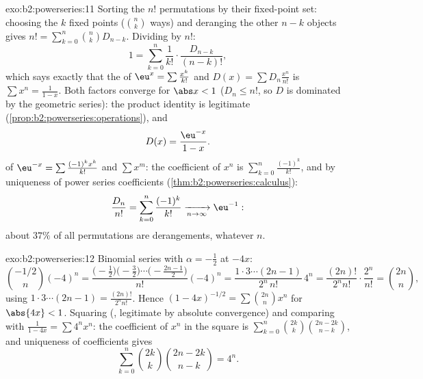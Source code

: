 \begin{solution}{exo:b2:powerseries:11}
Sorting the $n!$ permutations by their fixed-point set: choosing
the $k$ fixed points ($\binom nk$ ways) and deranging the other
$n - k$ objects gives $n! = \sum_{k=0}^n\binom nk D_{n-k}$.
Dividing by $n!$:
\[
1 = \sum_{k=0}^{n}\frac{1}{k!}\cdot\frac{D_{n-k}}{(n-k)!} ,
\]
which says exactly that the  of $\eu^x =
\sum\frac{x^k}{k!}$ and $D(x) = \sum D_n\frac{x^n}{n!}$ is
$\sum x^n = \frac{1}{1-x}$. Both factors converge 
for $\abs x < 1$ ($D_n \leq n!$, so $D$ is dominated by the
geometric series): the product identity is legitimate
(\cref{prop:b2:powerseries:operations}), and
\[
D(x) = \frac{\eu^{-x}}{1-x} .
\]
 of $\eu^{-x} = \sum\frac{(-1)^kx^k}{k!}$ and
$\sum x^m$: the coefficient of $x^n$ is
$\sum_{k=0}^{n}\frac{(-1)^k}{k!}$, and by uniqueness of power
series coefficients (\cref{thm:b2:powerseries:calculus}):
\[
\frac{D_n}{n!} = \sum_{k=0}^{n}\frac{(-1)^k}{k!}
\xrightarrow[n\to\infty]{} \eu^{-1} :
\]
about $37\%$ of all permutations are derangements, whatever
$n$.
\end{solution}

\begin{solution}{exo:b2:powerseries:12}
Binomial series with $\alpha = -\frac12$ at $-4x$:
\[
\binom{-1/2}{n}(-4)^n
= \frac{\bigl(-\frac12\bigr)\bigl(-\frac32\bigr)\cdots
\bigl(-\frac{2n-1}2\bigr)}{n!}(-4)^n
= \frac{1\cdot3\cdots(2n-1)}{2^n\,n!}\,4^n
= \frac{(2n)!}{2^n n!}\cdot\frac{2^n}{n!}
= \binom{2n}{n},
\]
using $1\cdot3\cdots(2n-1) = \frac{(2n)!}{2^nn!}$. Hence
$(1-4x)^{-1/2} = \sum\binom{2n}nx^n$ for $\abs{4x} < 1$.
Squaring (, legitimate by absolute convergence)
and comparing with $\frac{1}{1-4x} = \sum 4^nx^n$: the
coefficient of $x^n$ in the square is
$\sum_{k=0}^n\binom{2k}k\binom{2n-2k}{n-k}$, and uniqueness of
coefficients gives
\[
\sum_{k=0}^{n}\binom{2k}{k}\binom{2n-2k}{n-k} = 4^n .
\]
\end{solution}

